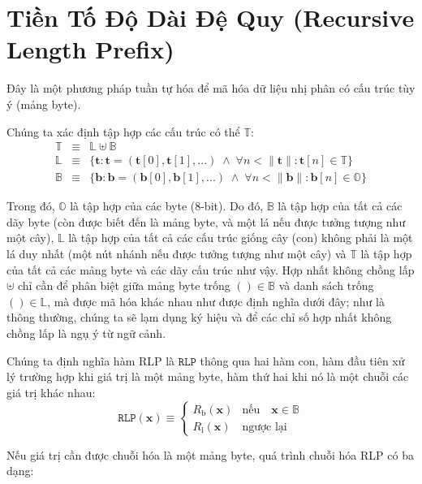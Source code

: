\documentclass[9pt,oneside]{amsart}
\makeatletter
\newcommand{\linkdest}[1]{\Hy@raisedlink{\hypertarget{#1}{}}}
\makeatother
\begin{document}
\section{Tiền Tố Độ Dài Đệ Quy (Recursive Length Prefix)}\label{app:rlp}\hypertarget{rlp}{}
Đây là một phương pháp tuần tự hóa để mã hóa dữ liệu nhị phân có cấu trúc tùy ý (mảng byte).

Chúng ta xác định tập hợp các cấu trúc có thể $\mathbb{T}$:
\begin{eqnarray}
\mathbb{T} & \equiv & \mathbb{L} \uplus \mathbb{B} \\
\mathbb{L} & \equiv & \{ \mathbf{t}: \mathbf{t} = ( \mathbf{t}[0], \mathbf{t}[1], ... ) \; \wedge \; \forall n < \lVert \mathbf{t} \rVert : \mathbf{t}[n] \in \mathbb{T} \} \\
\mathbb{B} & \equiv & \{ \mathbf{b}: \mathbf{b} = ( \mathbf{b}[0], \mathbf{b}[1], ... ) \; \wedge \; \forall n < \lVert \mathbf{b} \rVert : \mathbf{b}[n] \in \mathbb{O} \}
\end{eqnarray}

Trong đó, $\mathbb{O}$ là tập hợp của các byte (8-bit). Do đó, $\mathbb{B}$ là tập hợp của tất cả các dãy byte (còn được biết đến là mảng byte, và một lá nếu được tưởng tượng như một cây), $\mathbb{L}$ là tập hợp của tất cả các cấu trúc giống cây (con) không phải là một lá duy nhất (một nút nhánh nếu được tưởng tượng như một cây) và $\mathbb{T}$ là tập hợp của tất cả các mảng byte và các dãy cấu trúc như vậy. Hợp nhất không chồng lấp $\uplus$ chỉ cần để phân biệt giữa mảng byte trống $()\in\mathbb{B}$ và danh sách trống $()\in\mathbb{L}$, mà được mã hóa khác nhau như được định nghĩa dưới đây; như là thông thường, chúng ta sẽ lạm dụng ký hiệu và để các chỉ số hợp nhất không chồng lấp là ngụ ý từ ngữ cảnh.

Chúng ta định nghĩa hàm RLP là $\mathtt{RLP}$ thông qua hai hàm con, hàm đầu tiên xử lý trường hợp khi giá trị là một mảng byte, hàm thứ hai khi nó là một chuỗi các giá trị khác nhau:
\begin{equation}
\mathtt{RLP}(\mathbf{x}) \equiv \begin{cases} R_{\mathrm{b}}(\mathbf{x}) & \text{nếu} \quad \mathbf{x} \in \mathbb{B} \\ R_{\mathrm{l}}(\mathbf{x}) & \text{ngược lại} \end{cases}
\end{equation}

\hypertarget{RLP_serialisation_of_a_byte_array_R__b_word_def}{}\linkdest{R__b}Nếu giá trị cần được chuỗi hóa là một mảng byte, quá trình chuỗi hóa RLP có ba dạng:
\end{document}
